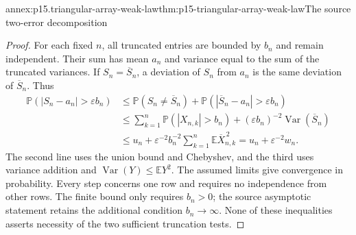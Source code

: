 \begin{annexitem}{annex:p15.triangular-array-weak-law}{thm:p15-triangular-array-weak-law}{The source two-error decomposition}
\begin{proof}
For each fixed \(n\), all truncated entries are bounded by \(b_n\)
and remain independent. Their sum has mean \(a_n\) and variance
equal to the sum of the truncated variances.
If \(S_n=\overline S_n\), a deviation of \(S_n\) from \(a_n\)
is the same deviation of \(\overline S_n\). Thus
\[
 \begin{aligned}
 \mathbb P(|S_n-a_n|>\varepsilon b_n)
 &\leq\mathbb P(S_n\ne\overline S_n)
       +\mathbb P(|\overline S_n-a_n|>\varepsilon b_n)\\
 &\leq\sum_{k=1}^n\mathbb P(|X_{n,k}|>b_n)
       +(\varepsilon b_n)^{-2}
                    \operatorname{Var}(\overline S_n)\\
 &\leq u_n+\varepsilon^{-2}b_n^{-2}
                         \sum_{k=1}^n\mathbb E\overline X_{n,k}^{\,2}
       =u_n+\varepsilon^{-2}w_n.
 \end{aligned}
\]
The second line uses the union bound and Chebyshev, and the third
uses variance addition and \(\operatorname{Var}(Y)\leq\mathbb EY^2\).
The assumed limits give convergence in probability.
Every step concerns one row and requires no independence from other
rows. The finite bound only requires \(b_n>0\); the source asymptotic
statement retains the additional condition \(b_n\to\infty\).
None of these inequalities asserts necessity of the two sufficient
truncation tests.
\end{proof}
\end{annexitem}

